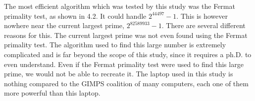 \documentclass[main.tex]{subfiles}
\begin{document}
The most efficient algorithm which was tested by this study was the Fermat
primality test, as shown in 4.2. It could handle $2^{44497}-1$. This is however
nowhere near the current largest prime, $2^{82589933}-1$. There are several
different reasons for this. The current largest prime was not even found using
the Fermat primality test. The algorithm used to find this large number is
extremely complicated and is far beyond the scope of this study, since it
requires a ph.D. to even understand. Even if the Fermat primality test were used
to find this large prime, we would not be able to recreate it. The laptop used
in this study is nothing compared to the GIMPS coalition of many computers, each
one of them more powerful than this laptop. 

 
\end{document}

